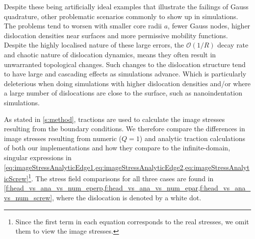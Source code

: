 \documentclass[11pt]{iopart}
\begin{document}
Despite these being artificially ideal examples that illustrate the failings of Gauss quadrature, other problematic scenarios commonly to show up in simulations. The problems tend to worsen with smaller core radii $a$, fewer Gauss nodes, higher dislocation densities near surfaces and more permissive mobility functions. Despite the highly localised nature of these large errors, the $\mathcal{O}(1/R)$ decay rate and chaotic nature of dislocation dynamics, means they often result in unwarranted topological changes. Such changes to the dislocation structure tend to have large and cascading effects as simulations advance. Which is particularly deleterious when doing simulations with higher dislocation densities and/or where a large number of dislocations are close to the surface, such as nanoindentation simulations.

As stated in \cref{s:method}, tractions are used to calculate the image stresses resulting from the boundary conditions. We therefore compare the differences in image stresses resulting from numeric ($Q = 1$) and analytic traction calculations of both our implementations and how they compare to the infinite-domain, singular expressions in \cref{eq:imageStressAnalyticEdge1,eq:imageStressAnalyticEdge2,eq:imageStressAnalyticScrew}\footnote{Since the first term in each equation corresponds to the real stresses, we omit them to view the image stresses.}. The stress field comparisons for all three cases are found in \cref{f:head_vs_ana_vs_num_eperp,f:head_vs_ana_vs_num_epar,f:head_vs_ana_vs_num_screw}, where the dislocation is denoted by a white dot.
\end{document}

